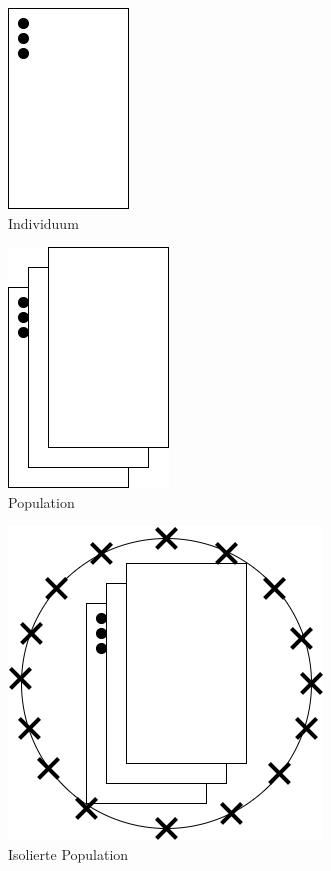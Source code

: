 \begin{figure}[!htb]
	\centering
	\includegraphics[scale=0.5]{img/rechenberg_notation/individuum.png}
	\caption{Individuum}
\label{fig:individuum}
\end{figure}
\begin{figure}[!htb]
	\centering
	\includegraphics[scale=0.5]{img/rechenberg_notation/population.png}
	\caption{Population}
\label{fig:population}
\end{figure}
\begin{figure}[!htb]
	\centering
	\includegraphics[scale=0.5]{img/rechenberg_notation/population_isoliert.png}
	\caption{Isolierte Population}
\label{fig:population_isoliert}
\end{figure}
